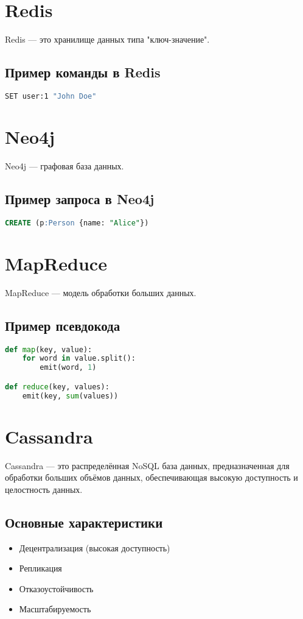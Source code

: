 \documentclass[a4paper,12pt]{article}
\begin{document}
\newpage
\section{Redis}
Redis — это хранилище данных типа "ключ-значение".

\subsection{Пример команды в Redis}
\begin{lstlisting}[language=sh, caption=Добавление значения]
SET user:1 "John Doe"
\end{lstlisting}

\section{Neo4j}
Neo4j — графовая база данных.

\subsection{Пример запроса в Neo4j}
\begin{lstlisting}[language=SQL, caption=Создание узла]
CREATE (p:Person {name: "Alice"})
\end{lstlisting}

\section{MapReduce}
MapReduce — модель обработки больших данных.

\subsection{Пример псевдокода}
\begin{lstlisting}[language=Python, caption=MapReduce]
def map(key, value):
    for word in value.split():
        emit(word, 1)

def reduce(key, values):
    emit(key, sum(values))
\end{lstlisting}


\section{Cassandra}
Cassandra — это распределённая NoSQL база данных, предназначенная для обработки больших объёмов данных, обеспечивающая высокую доступность и целостность данных.

\subsection{Основные характеристики}
\begin{itemize}
    \item Децентрализация (высокая доступность)
    \item Репликация
    \item Отказоустойчивость
    \item Масштабируемость
\end{itemize}
\end{document}
